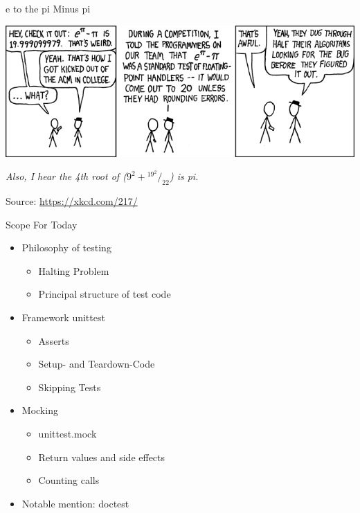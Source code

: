 
\begin{frame}[t,plain]
\titlepage
\end{frame}


\begin{frame}[fragile]{e to the pi Minus pi}
%
\begin{center}
\includegraphics[width=.8\linewidth]{./gfx/18-xkcd-e_to_the_pi_minus_pi}

\vspace{12pt}
\emph{Also, I hear the 4th root of ($9^2 + {}^{19^2}/_{22}$) is pi.}

\vspace{6pt}
Source: \url{https://xkcd.com/217/}
\end{center}
%
\end{frame}


\begin{frame}{Scope For Today}
%
\begin{itemize}
\item Philosophy of testing
	\begin{itemize}
	\item Halting Problem
	\item Principal structure of test code
	\end{itemize}
\item Framework unittest
	\begin{itemize}
	\item Asserts
	\item Setup- and Teardown-Code
	\item Skipping Tests
	\end{itemize}
\item Mocking
	\begin{itemize}
	\item unittest.mock
	\item Return values and side effects
	\item Counting calls
	\end{itemize}
\item Notable mention: doctest
\end{itemize}
%
\end{frame}

